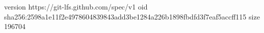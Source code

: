 version https://git-lfs.github.com/spec/v1
oid sha256:2598a1e11f2e4978604839843add3be1284a226b1898fbdfd3f7eaf5accff115
size 196704
